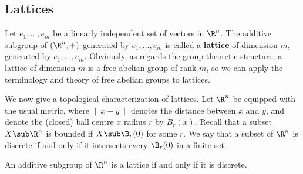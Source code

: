 \subsection{Lattices}
Let $e_1,\dots,e_m$ be a linearly independent set of vectors in $\R^n$. The additive subgroup of $(\R^n,+)$ generated by $e_1,\dots,e_m$ is called a \textbf{lattice} of dimension $m$, generated by $e_1,\dots,e_m$. Obviously, as
regards the group-theoretic structure, a lattice of dimension $m$ is a free
abelian group of rank $m$, so we can apply the terminology and theory of
free abelian groups to lattices.\par
We now give a topological characterization of lattices. Let $\R^n$ be equipped with the usual metric, where $\|x-y\|$ denotes the distance between $x$ and $y$, and denote the (closed) ball centre $x$ radius $r$ by $B_r(x)$. Recall that a subset $X\sub\R^n$ is bounded if $X\sub\B_r(0)$ for some $r$. We say that a subset of $\R^n$ is discrete if and only if it intersects every $\B_r(0)$ in a finite set.
\begin{proposition}
An additive subgroup of $\R^n$ is a lattice if and only if it is discrete.
\end{proposition}
